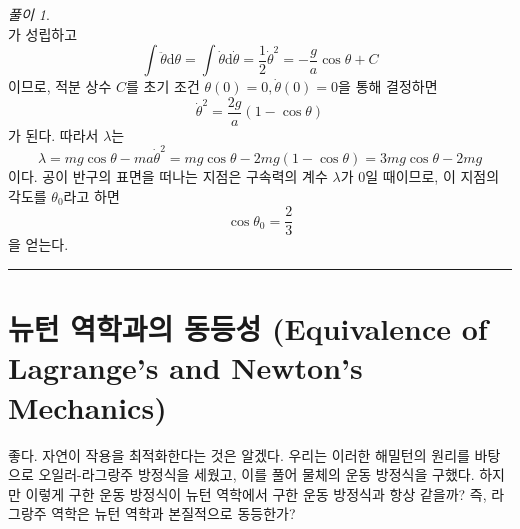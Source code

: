 \documentclass[chapter, oneside, b5paper]{oblivoir}
\theoremstyle{plain}
\theoremstyle{definition}
\theoremstyle{remark}
\newtheorem*{solution}{풀이}
\begin{document}
\begin{solution}
\begin{equation}
    \end{equation}
    가 성립하고
    \begin{equation}
        \int \ddot{\theta} \mathrm{d}\theta = \int \dot{\theta} \mathrm{d}\dot{\theta} = \frac{1}{2}\dot{\theta}^2 = -\frac{g}{a}\cos{\theta} + C
    \end{equation}
    이므로, 적분 상수 $C$를 초기 조건 $\theta(0) = 0, \dot{\theta}(0) = 0$을 통해 결정하면
    \begin{equation}
        \dot{\theta}^2 = \frac{2g}{a}(1-\cos{\theta})
    \end{equation}
    가 된다. 따라서 $\lambda$는
    \begin{equation}
        \lambda = mg\cos{\theta} - ma\dot{\theta}^2 = mg\cos{\theta} - 2mg(1-\cos{\theta}) = 3mg\cos{\theta} - 2mg
    \end{equation}
    이다. 공이 반구의 표면을 떠나는 지점은 구속력의 계수 $\lambda$가 0일 때이므로, 이 지점의 각도를 $\theta_0$라고 하면
    \begin{equation}
        \cos{\theta_0} = \frac{2}{3}
    \end{equation}
    을 얻는다.
\end{solution}

\noindent\rule{\textwidth}{0.8pt} %
\vspace{1em} %

\section{뉴턴 역학과의 동등성 (Equivalence of Lagrange's and Newton's Mechanics)}
좋다. 자연이 작용을 최적화한다는 것은 알겠다. 우리는 이러한 해밀턴의 원리를 바탕으로 오일러-라그랑주 방정식을 세웠고, 이를 풀어 물체의 운동 방정식을 구했다. 하지만 이렇게 구한 운동 방정식이 뉴턴 역학에서 구한 운동 방정식과 항상 같을까? 즉, 라그랑주 역학은 뉴턴 역학과 본질적으로 동등한가?
\end{document}
